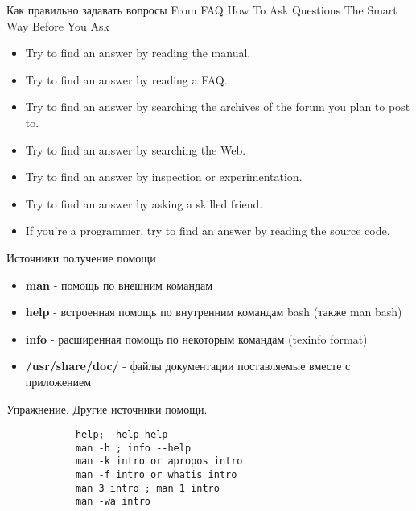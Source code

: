 \begin{frame}[fragile]{Как правильно задавать вопросы}
From FAQ How To Ask Questions The Smart Way
Before You Ask
  \begin{itemize}
	  \item Try to find an answer by reading the manual.
	  \item Try to find an answer by reading a FAQ.
	  \item Try to find an answer by searching the archives of the forum you plan to post to.
	  \item Try to find an answer by searching the Web.
	  \item Try to find an answer by inspection or experimentation.
	  \item Try to find an answer by asking a skilled friend.
	  \item If you're a programmer, try to find an answer by reading the source code.
    \end{itemize}
\end{frame}


\begin{frame}[fragile]{Источники получение помощи}
\begin{itemize}
    \pause
    \item \textbf{man} - помощь по внешним командам
    \pause
    \item \textbf{help} - встроенная помощь по внутренним командам bash (также man bash)
    \pause
    \item \textbf{info} - расширенная помощь по некоторым командам (texinfo format)
    \item \textbf{/usr/share/doc/} - файлы документации поставляемые вместе с приложением
\end{itemize}


     \begin{block}{Упражнение. Другие источники помощи.}
        \begin{lstlisting}
            help;  help help
            man -h ; info --help
            man -k intro or apropos intro
            man -f intro or whatis intro
            man 3 intro ; man 1 intro
            man -wa intro
        \end{lstlisting}
    \end{block}
\end{frame}

